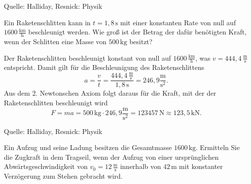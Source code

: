 \begin{MExercises}
\begin{MExercise}
\begin{MSolution}
               \end{MSolution}
               
               Quelle: Halliday, Resnick: Physik
               \end{MExercise}
               
               \begin{MExercise}
               Ein Raketenschlitten kann in $t={1,8} \,\text{s}$ mit einer konstanten Rate von null auf $1600\,\frac{\text{km}}{\text{h}}$ beschleunigt werden. Wie gro{\ss} ist der Betrag der daf\"ur ben\"otigten Kraft, wenn der Schlitten eine Masse von $500\,\text{kg}$ besitzt?
               
               \begin{MSolution}
               Der Raketenschlitten beschleunigt konstant von null auf $1600\,\frac{\text{km}}{\text{h}}$, was $v= 444,4\,\frac{\text{m}}{\text{s}}$ entspricht. Damit gilt f\"ur die Beschleunigung des Raketenschlittens
               \begin{equation*}
               a=\frac{v}{t}=\frac{{444,4}\,\frac{\text{m}}{\text{s}}}{{1,8} \,\text{s}}={246,9}\frac{\text{m}}{\text{s}^2}.
               \end{equation*}
               Aus dem 2. Newtonschen Axiom folgt daraus f\"ur die Kraft, mit der der Raketenschlitten beschleunigt wird
               \begin{equation*}
               F=ma=500\,\text{kg}\cdot {246,9}\frac{\text{m}}{\text{s}^2}= 123457 \,\text{N}\approx {123,5}\,\text{kN.} 
               \end{equation*}
               
               
               
               \end{MSolution}
               
               Quelle: Halliday, Resnick: Physik
               \end{MExercise}
               
               \begin{MExercise}
               Ein Aufzug und seine Ladung besitzen die Gesamtmasse $1600\,\text{kg}$. Ermitteln Sie die Zugkraft in dem Tragseil, wenn der Aufzug von einer urspr\"unglichen Abw\"artsgeschwindigkeit von $v_0=12\,\frac{\text{m}}{\text{s}}$ innerhalb von $42 \,\text{m}$ mit konstanter Verz\"ogerung zum Stehen gebracht wird.
               

\end{MExercise}
\end{MExercises}
